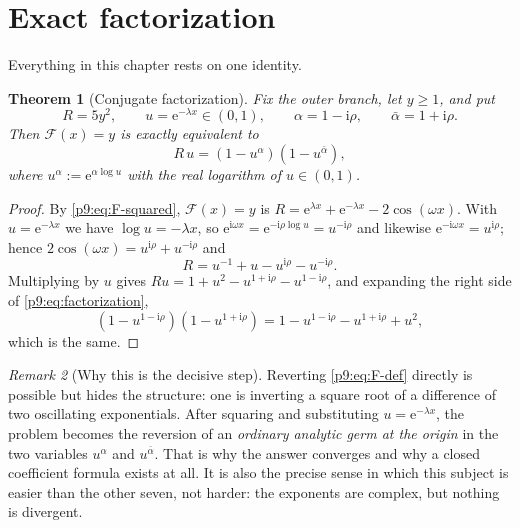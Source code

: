 \documentclass[11pt,a4paper,oneside]{book}
\theoremstyle{plain}
\newtheorem{theorem}{Theorem}[chapter]
\theoremstyle{definition}
\theoremstyle{remark}
\newtheorem{remark}[theorem]{Remark}
\newcommand{\e}{\mathrm{e}}
\newcommand{\ii}{\mathrm{i}}
\begin{document}
\section{Exact factorization}
\label{p9:sec:factorization}

Everything in this chapter rests on one identity.

\begin{theorem}[Conjugate factorization]\label{p9:thm:factorization}
Fix the outer branch, let $y\ge1$, and put
\begin{equation}\label{p9:eq:R-u}
 R=5y^{2},
 \qquad
 u=\e^{-\lambda x}\in(0,1),
 \qquad
 \alpha=1-\ii\rho,
 \qquad
 \bar\alpha=1+\ii\rho .
\end{equation}
Then $\mathcal{F}(x)=y$ is \emph{exactly} equivalent to
\begin{equation}\label{p9:eq:factorization}
 R\,u=(1-u^{\alpha})(1-u^{\bar\alpha}),
\end{equation}
where $u^{\alpha}:=\e^{\alpha\log u}$ with the real logarithm of
$u\in(0,1)$.
\end{theorem}

\begin{proof}
By \eqref{p9:eq:F-squared}, $\mathcal{F}(x)=y$ is
$R=\e^{\lambda x}+\e^{-\lambda x}-2\cos(\omega x)$.  With
$u=\e^{-\lambda x}$ we have $\log u=-\lambda x$, so
$\e^{\ii\omega x}=\e^{-\ii\rho\log u}=u^{-\ii\rho}$ and likewise
$\e^{-\ii\omega x}=u^{\ii\rho}$; hence
$2\cos(\omega x)=u^{\ii\rho}+u^{-\ii\rho}$ and
\[
 R=u^{-1}+u-u^{\ii\rho}-u^{-\ii\rho}.
\]
Multiplying by $u$ gives
$Ru=1+u^{2}-u^{1+\ii\rho}-u^{1-\ii\rho}$, and expanding the right side of
\eqref{p9:eq:factorization},
\[
 (1-u^{1-\ii\rho})(1-u^{1+\ii\rho})
 =1-u^{1-\ii\rho}-u^{1+\ii\rho}+u^{2},
\]
which is the same.
\end{proof}

\begin{remark}[Why this is the decisive step]\label{p9:rem:why-factor}
Reverting \eqref{p9:eq:F-def} directly is possible but hides the structure:
one is inverting a square root of a difference of two oscillating
exponentials.  After squaring and substituting $u=\e^{-\lambda x}$, the
problem becomes the reversion of an \emph{ordinary analytic germ at the
origin} in the two variables $u^{\alpha}$ and $u^{\bar\alpha}$.  That is why
the answer converges and why a closed coefficient formula exists at all.  It
is also the precise sense in which this subject is easier than the other
seven, not harder: the exponents are complex, but nothing is divergent.
\end{remark}
\end{document}
